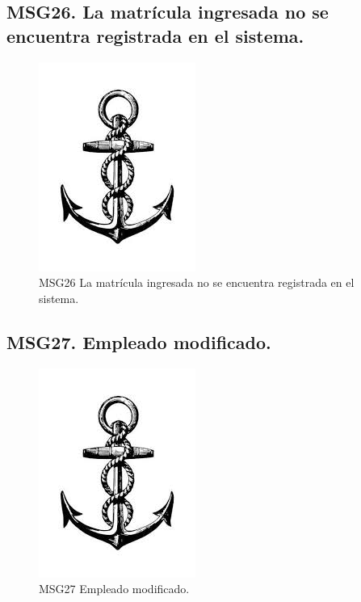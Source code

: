 \subsection{MSG26. La matrícula ingresada no se encuentra registrada en el sistema.}
    \begin{figure}[htbp]
        \begin{center}
            \includegraphics[width=.4\textwidth]{images/MSG/ancla}
            \caption{MSG26 La matrícula ingresada no se encuentra registrada en el sistema.}
            \label{fig:MSG26}
        \end{center}
    \end{figure}

\subsection{MSG27. Empleado modificado.}
    \begin{figure}[htbp]
        \begin{center}
            \includegraphics[width=.4\textwidth]{images/MSG/ancla}
            \caption{MSG27 Empleado modificado.}
            \label{fig:MSG27}
        \end{center}
    \end{figure}

